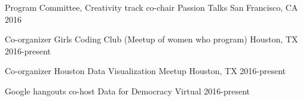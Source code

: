 

\begin{cvhonors}

  \cvhonor
    {Program Committee, Creativity track co-chair} %
    {Passion Talks} %
    {San Francisco, CA} %
    {2016} %

  \cvhonor
    {Co-organizer} %
    {Girls Coding Club (Meetup of women who program)} %
    {Houston, TX} %
    {2016-present} %

  \cvhonor
    {Co-organizer} %
    {Houston Data Visualization Meetup} %
    {Houston, TX} %
    {2016-present} %


  \cvhonor
    {Google hangouts co-host} %
    {Data for Democracy} %
    {Virtual} %
    {2016-present} %

\end{cvhonors}
